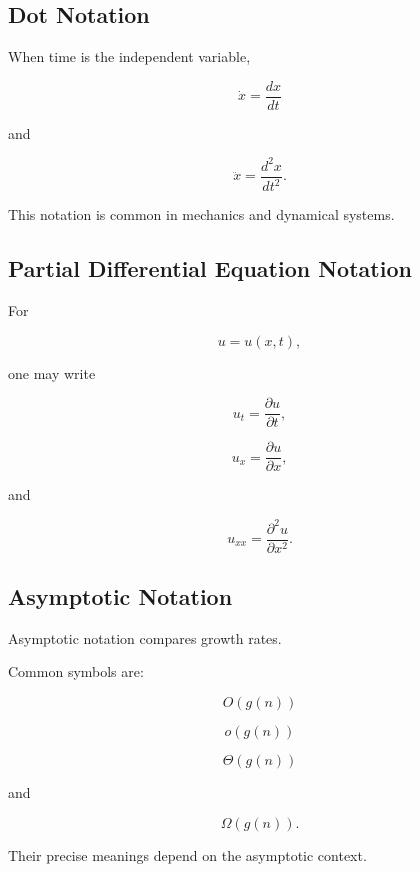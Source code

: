 \subsection{Dot Notation}
\label{subsec:dot-notation-reference}

When time is the independent variable,

\[
\boxed{
\dot{x}
=
\frac{dx}{dt}
}
\]

and

\[
\boxed{
\ddot{x}
=
\frac{d^2x}{dt^2}.
}
\]

This notation is common in mechanics and dynamical systems.

\subsection{Partial Differential Equation Notation}
\label{subsec:pde-notation-reference}

For

\[
u=u(x,t),
\]

one may write

\[
\boxed{
u_t
=
\frac{\partial u}{\partial t},
}
\]

\[
\boxed{
u_x
=
\frac{\partial u}{\partial x},
}
\]

and

\[
\boxed{
u_{xx}
=
\frac{\partial^2u}{\partial x^2}.
}
\]

\subsection{Asymptotic Notation}
\label{subsec:asymptotic-notation-reference}

Asymptotic notation compares growth rates.

Common symbols are:

\[
\boxed{
O(g(n))
}
\]

\[
\boxed{
o(g(n))
}
\]

\[
\boxed{
\Theta(g(n))
}
\]

and

\[
\boxed{
\Omega(g(n)).
}
\]

Their precise meanings depend on the asymptotic context.

